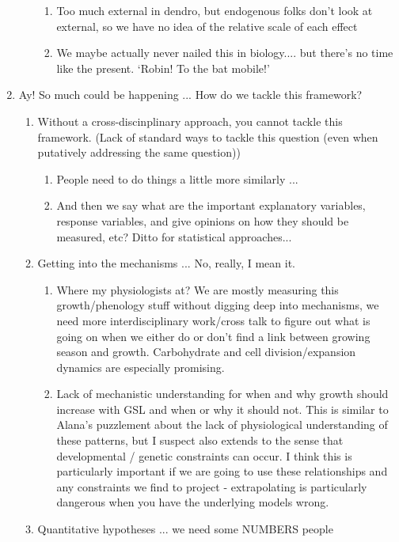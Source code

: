 \documentclass[11pt,letter]{article}
\begin{document}
\begin{enumerate}
\begin{enumerate}
\begin {enumerate}
\item Too much external in dendro, but endogenous folks don't look at external, so we have no idea of the relative scale of each effect
\item We maybe actually never nailed this in biology.... but there's no time like the present. `Robin! To the bat mobile!'
\end{enumerate}
\end{enumerate}
\item Ay! So much could be happening ... How do we tackle this framework?
\begin{enumerate}
\item Without a cross-discinplinary approach, you cannot tackle this framework. (Lack of standard ways to tackle this question (even when putatively addressing the same question))
\begin{enumerate}
\item People need to do things a little more similarly ...
\item And then we say what are the important explanatory variables, response variables, and give opinions on how they should be measured, etc? Ditto for statistical approaches...
\end{enumerate}
\item Getting into the mechanisms ... No, really, I mean it. 
\begin{enumerate}
\item Where my physiologists at? We are mostly measuring this growth/phenology stuff without digging deep into mechanisms, we need more interdisciplinary work/cross talk to figure out what is going on when we either do or don't find a link between growing season and growth. Carbohydrate and cell division/expansion dynamics are especially promising.
\item Lack of mechanistic understanding for when and why growth should increase with GSL and when or why it should not. This is similar to Alana's puzzlement about the lack of physiological understanding of these patterns, but I suspect also extends to the sense that developmental / genetic constraints can occur. I think this is particularly important if we are going to use these relationships and any constraints we find to project - extrapolating is particularly dangerous when you have the underlying models wrong.
\end{enumerate}
\item Quantitative hypotheses ... we need some NUMBERS people
\begin{enumerate}

\end{enumerate}
\end{enumerate}
\end{enumerate}
\end{document}
